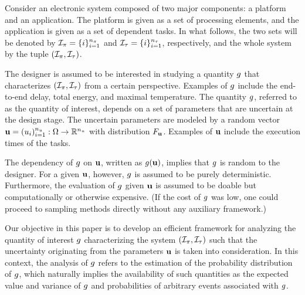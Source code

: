 Consider an electronic system composed of two major components: a platform and
an application. The platform is given as a set of processing elements, and the
application is given as a set of dependent tasks. In what follows, the two sets
will be denoted by ${\mathcal{I}_{\pi}} = \{ i \}_{i = 1}^{n_\pi}$ and ${\mathcal{I}_{\tau}} = \{ i \}_{i =
1}^{n_\tau}$, respectively, and the whole system by the tuple $({\mathcal{I}_{\pi}}, {\mathcal{I}_{\tau}})$.

The designer is assumed to be interested in studying a quantity $g$ that
characterizes $({\mathcal{I}_{\pi}}, {\mathcal{I}_{\tau}})$ from a certain perspective. Examples of $g$
include the end-to-end delay, total energy, and maximal temperature. The
quantity $g$, referred to as the quantity of interest, depends on a set of
parameters that are uncertain at the design stage. The uncertain parameters are
modeled by a random vector $\mathbf{u} = (u_i)_{i = 1}^{n_u}: \Omega \to \mathbb{R}^{n_u}$
with distribution $F_{\mathbf{u}}$. Examples of $\mathbf{u}$ include the execution
times of the tasks.

The dependency of $g$ on $\mathbf{u}$, written as $g(\mathbf{u})$, implies that $g$ is
random to the designer. For a given $\mathbf{u}$, however, $g$ is assumed to be purely
deterministic. Furthermore, the evaluation of $g$ given $\mathbf{u}$ is assumed to be
doable but computationally or otherwise expensive. (If the cost of $g$ was low,
one could proceed to sampling methods directly without any auxiliary framework.)

Our objective in this paper is to develop an efficient framework for analyzing
the quantity of interest $g$ characterizing the system $({\mathcal{I}_{\pi}}, {\mathcal{I}_{\tau}})$ such
that the uncertainty originating from the parameters $\mathbf{u}$ is taken into
consideration. In this context, the analysis of $g$ refers to the estimation of
the probability distribution of $g$, which naturally implies the availability
of such quantities as the expected value and variance of $g$ and probabilities
of arbitrary events associated with $g$.
